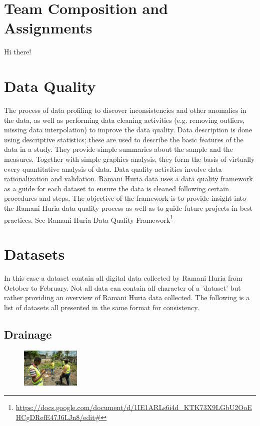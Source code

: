 \documentclass[a4paper,12pt,twoside]{article}
\begin{document}
\section{Team Composition and Assignments}
Hi there!
\newpage
\section{Data Quality}
The process of data profiling to discover inconsistencies and other anomalies in the data, as well as performing data cleaning activities (e.g. removing outliers, missing data interpolation) to improve the data quality. Data description is done using descriptive statistics; these are used to describe the basic features of the data in a study. They provide simple summaries about the sample and the measures. Together with simple graphics analysis, they form the basis of virtually every quantitative analysis of data. Data quality activities involve data rationalization and validation.
Ramani Huria data uses a data quality framework as a guide for each dataset to ensure the data is cleaned following certain procedures and steps. The objective of the framework is to provide insight into the Ramani Huria data quality process as well as to guide future projects in best practices. See  \href{https://docs.google.com/document/d/1IE1ARLs6i4d_KTK73X9LGbU2OoEHCgDRefE47J6LJn8/edit#}{Ramani Huria Data Quality Framework}\footnote{\url{https://docs.google.com/document/d/1IE1ARLs6i4d_KTK73X9LGbU2OoEHCgDRefE47J6LJn8/edit#}}


\section{Datasets}
In this case a dataset contain all digital data collected by Ramani Huria from October to February. Not all data can contain all character of a 'dataset' but rather providing an overview of Ramani Huria data collected. The following is a list of datasets all presented in the same format for consistency. 
\subsection{Drainage}
\begin{figure} %
    \centering
    \includegraphics[width=0.25\textwidth]{images/Drainage_Mapping.jpg}
\end{figure}
\end{document}
